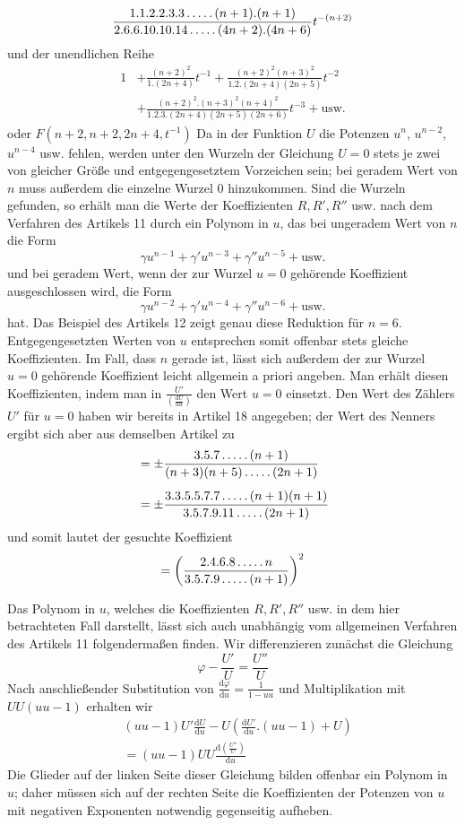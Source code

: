 \[
\frac{1.1.2.2.3.3\mathinner{.\,.\,.\,.\,.}(n+1).(n+1)}
{2.6.6.10.10.14\mathinner{.\,.\,.\,.\,.}(4n+2).(4n+6)}t^{-(n+2)}
\]
und der unendlichen Reihe
\[
\begin{aligned}
1&+\frac{(n+2)^2}{1.(2n+4)}t^{-1}
+\frac{(n+2)^2(n+3)^2}{1.2.(2n+4)(2n+5)}t^{-2}\\
&+\frac{(n+2)^2.(n+3)^2(n+4)^2}
{1.2.3.(2n+4)(2n+5)(2n+6)}t^{-3}+\mathrm{usw.}
\end{aligned}
\]
oder $F(n+2,n+2,2n+4,t^{-1})$
Da in der Funktion $U$ die Potenzen $u^n$, $u^{n-2}$, $u^{n-4}$ usw. fehlen, werden unter den Wurzeln der Gleichung $U=0$ stets je zwei von gleicher Größe und entgegengesetztem Vorzeichen sein; bei geradem Wert von $n$ muss außerdem die einzelne Wurzel $0$ hinzukommen. Sind die Wurzeln gefunden, so erhält man die Werte der Koeffizienten $R,R',R''$ usw. nach dem Verfahren des Artikels 11 durch ein Polynom in $u$, das bei ungeradem Wert von $n$ die Form
\[
\gamma u^{n-1}+\gamma'u^{n-3}+\gamma''u^{n-5}+\mathrm{usw.}
\]
und bei geradem Wert, wenn der zur Wurzel $u=0$ gehörende Koeffizient ausgeschlossen wird, die Form
\[
\gamma u^{n-2}+\gamma'u^{n-4}+\gamma''u^{n-6}+\mathrm{usw.}
\]
hat. Das Beispiel des Artikels 12 zeigt genau diese Reduktion für $n=6$. Entgegengesetzten Werten von $u$ entsprechen somit offenbar stets gleiche Koeffizienten. Im Fall, dass $n$ gerade ist, lässt sich außerdem der zur Wurzel $u=0$ gehörende Koeffizient leicht allgemein a priori angeben. Man erhält diesen Koeffizienten, indem man in $\frac{U'}{(\frac{\mathrm{d}U}{\mathrm{d}u})}$ den Wert $u=0$ einsetzt. Den Wert des Zählers $U'$ für $u=0$ haben wir bereits in Artikel 18 angegeben; der Wert des Nenners ergibt sich aber aus demselben Artikel zu
\[
\begin{aligned}&=\pm\frac{3.5.7\mathinner{.\,.\,.\,.\,.}(n+1)}
{(n+3)(n+5)\mathinner{.\,.\,.\,.\,.}(2n+1)}\\[5pt]&=\pm\frac{3.3.5.5.7.7\mathinner{.\,.\,.\,.\,.}(n+1)(n+1)}
{3.5.7.9.11\mathinner{.\,.\,.\,.\,.}(2n+1)}\end{aligned}
\]
und somit lautet der gesuchte Koeffizient
\[
=\left(\frac{2.4.6.8\mathinner{.\,.\,.\,.\,.} n}
{3.5.7.9\mathinner{.\,.\,.\,.\,.}(n+1)}\right)^2
\]

Das Polynom in $u$, welches die Koeffizienten $R,R',R''$ usw. in dem hier betrachteten Fall darstellt, lässt sich auch unabhängig vom allgemeinen Verfahren des Artikels 11 folgendermaßen finden. Wir differenzieren zunächst die Gleichung
\[
\varphi-\frac{U'}U=\frac{U''}U
\]
Nach anschließender Substitution von $\frac{\mathrm{d}\varphi}{\mathrm{d}u}
=\frac1{1-uu}$ und Multiplikation mit $UU(uu-1)$ erhalten wir
\[
\begin{aligned}&(uu-1)U'\frac{\mathrm{d}U}{\mathrm{d}u}
-U\left(\frac{\mathrm{d}U'}{\mathrm{d}u}.(uu-1)+U\right)\\[5pt]&=(uu-1)UU\frac{\mathrm{d}(\frac{U''}U)}{\mathrm{d}u}\end{aligned}
\]
Die Glieder auf der linken Seite dieser Gleichung bilden offenbar ein Polynom in $u$; daher müssen sich auf der rechten Seite die Koeffizienten der Potenzen von $u$ mit negativen Exponenten notwendig gegenseitig aufheben.

